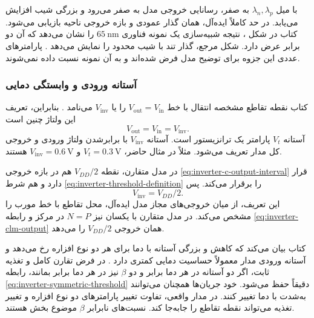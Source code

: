 با میل \(\lambda_n,\lambda_p\) به صفر، رسانایی خروجی مدل به
صفر می‌رود و بزرگی شیب افزایش می‌یابد. در حد کاملاً ایده‌آل،
همان گذار عمودی و بازه خروجی ناحیه  بازیابی می‌شود.
کتاب در شکل ، نتیجه شبیه‌سازی یک نمونه فناوری
\(\qty{65}{\nano\metre}\) را نشان می‌دهد که  آن دو
برابر  عرض دارد. شکل مرجع، گذار تند با شیب محدود را
نمایش می‌دهد \cite[صفحه ۸۹]{weste}. پارامترهای عددی این جزوه
برای توضیح مدل فرض شده‌اند و به آن نمونه نسبت داده نمی‌شوند.

\subsubsection{آستانه ورودی  و وابستگی دمایی}
\label{sec:inverter-input-threshold}
کتاب نقطه تقاطع مشخصه انتقال با خط
\(V_{\mathrm{out}}=V_{\mathrm{in}}\) را
 یا \(V_{\mathrm{inv}}\) می‌نامد
\cite[صفحه ۸۹]{weste}. بنابراین، تعریف این ولتاژ چنین است
\begin{equation}
 V_{\mathrm{out}}=V_{\mathrm{in}}=V_{\mathrm{inv}}.
 \label{eq:inverter-threshold-definition}
\end{equation}
آستانه \(V_t\) پارامتر یک ترانزیستور است. آستانه
\(V_{\mathrm{inv}}\) با برابرشدن ولتاژ ورودی و خروجی کل مدار
تعریف می‌شود. مثلاً در مثال حاضر، \(V_t=\qty{0.3}{\volt}\) و
\(V_{\mathrm{inv}}=\qty{0.6}{\volt}\) هستند.

در مدل متقارن، نقطه \(V_{DD}/2\) هم در بازه خروجی
\eqref{eq:inverter-c-output-interval} قرار دارد و هم شرط
\eqref{eq:inverter-threshold-definition} را برقرار می‌کند. پس
\begin{equation}
 \boxed{V_{\mathrm{inv}}=V_{DD}/2}.
 \label{eq:inverter-symmetric-threshold}
\end{equation}
این تعریف، از میان خروجی‌های مجاز مدل ایده‌آل، محل تقاطع با خط
مورب را مشخص می‌کند. در مدل متقارن با  یکسان نیز
\(N=P\) در مرکز و رابطه \eqref{eq:inverter-clm-output} همان
خروجی \(V_{DD}/2\) را می‌دهد.

کتاب بیان می‌کند که کاهش  و بزرگی آستانه با دما
برای هر دو نوع افزاره رخ می‌دهد و آستانه ورودی مدار معمولاً
حساسیت دمایی کمتری دارد \cite[صفحه ۸۹]{weste}. در فرض تقارن
کامل و تغذیه ثابت، اگر دو آستانه در هر دما برابر و دو
\(\beta\) نیز در هر دما برابر بمانند، رابطه
\eqref{eq:inverter-symmetric-threshold} دقیقاً حفظ می‌شود.
خود جریان‌ها همچنان می‌توانند به‌شدت با دما تغییر کنند.
در مدار واقعی، تفاوت تغییر پارامترهای دو نوع افزاره و تغییر
تغذیه می‌تواند نقطه تقاطع را جابه‌جا کند. نسبت‌های نابرابر
\(\beta\) موضوع بخش  هستند.

